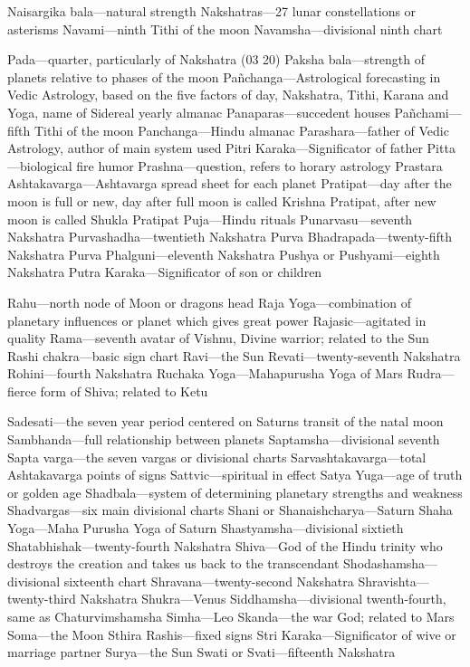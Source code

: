 Naisargika bala—natural strength Nakshatras—27 lunar constellations or asterisms Navami—ninth Tithi of the moon Navamsha—divisional ninth chart  

Pada—quarter, particularly of Nakshatra (03 20) Paksha bala—strength of planets relative to phases of the moon Pañchanga—Astrological forecasting in Vedic Astrology, based on the five factors of day, Nakshatra, Tithi, Karana and Yoga, name of Sidereal yearly almanac Panaparas—succedent houses Pañchami—fifth Tithi of the moon Panchanga—Hindu almanac Parashara—father of Vedic Astrology, author of main system used Pitri Karaka—Significator of father Pitta—biological fire humor Prashna—question, refers to horary astrology Prastara Ashtakavarga—Ashtavarga spread sheet for each planet Pratipat—day after the moon is full or new, day after full moon is called Krishna Pratipat, after new moon is called Shukla Pratipat Puja—Hindu rituals Punarvasu—seventh Nakshatra Purvashadha—twentieth Nakshatra Purva Bhadrapada—twenty-fifth Nakshatra Purva Phalguni—eleventh Nakshatra Pushya or Pushyami—eighth Nakshatra Putra Karaka—Significator of son or children  

Rahu—north node of Moon or dragons head Raja Yoga—combination of planetary influences or planet which gives great power Rajasic—agitated in quality Rama—seventh avatar of Vishnu, Divine warrior; related to the Sun Rashi chakra—basic sign chart Ravi—the Sun Revati—twenty-seventh Nakshatra Rohini—fourth Nakshatra Ruchaka Yoga—Mahapurusha Yoga of Mars Rudra—fierce form of Shiva; related to Ketu  

Sadesati—the seven year period centered on Saturns transit of the natal moon Sambhanda—full relationship between planets Saptamsha—divisional seventh Sapta varga—the seven vargas or divisional charts Sarvashtakavarga—total Ashtakavarga points of signs Sattvic—spiritual in effect Satya Yuga—age of truth or golden age Shadbala—system of determining planetary strengths and weakness Shadvargas—six main divisional charts Shani or Shanaishcharya—Saturn Shaha Yoga—Maha Purusha Yoga of Saturn Shastyamsha—divisional sixtieth Shatabhishak—twenty-fourth Nakshatra Shiva—God of the Hindu trinity who destroys the creation and takes us back to the transcendant Shodashamsha—divisional sixteenth chart Shravana—twenty-second Nakshatra Shravishta—twenty-third Nakshatra Shukra—Venus Siddhamsha—divisional twenth-fourth, same as Chaturvimshamsha Simha—Leo Skanda—the war God; related to Mars Soma—the Moon Sthira Rashis—fixed signs Stri Karaka—Significator of wive or marriage partner Surya—the Sun Swati or Svati—fifteenth Nakshatra  

